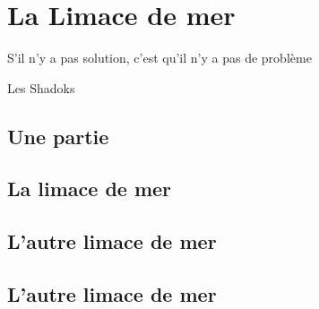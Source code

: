 \chapter{La Limace de mer}
\epigraph{S'il n'y a pas solution, c'est qu'il n'y a pas de problème}{Les Shadoks}

\section{Une partie}
\lipsum[1-40]

\section{La limace de mer}

\lipsum[1-16]

\section{L'autre limace de mer}
\lipsum[2-25]

\section{L'autre limace de mer}
\lipsum[2-30]